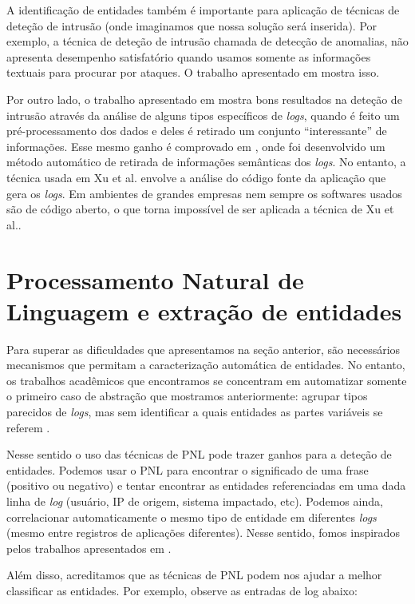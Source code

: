 \documentclass[
	12pt,				%
	openright,			%
	twoside,			%
	a4paper,			%
	english,			%
	spanish,			%
	brazil,				%
	]{abntex2}
\begin{document}
A identificação de entidades também é importante para aplicação de técnicas de deteção de intrusão (onde imaginamos que nossa solução será inserida). Por exemplo, a técnica de deteção de intrusão chamada de detecção de anomalias, não apresenta desempenho satisfatório quando usamos somente as informações textuais para procurar por ataques. O trabalho apresentado em \cite{li2013automatic} mostra isso.

Por outro lado, o trabalho apresentado em \cite{yen2013beehive} mostra bons resultados na deteção de intrusão através da análise de alguns tipos específicos de \emph{logs}, quando é feito um pré-processamento dos dados e deles é retirado um conjunto ``interessante'' de informações. Esse mesmo ganho é comprovado em \cite{xu2009detecting}, onde foi desenvolvido um método automático de retirada de informações semânticas dos \emph{logs}. No entanto, a técnica usada em Xu et al. envolve a análise do código fonte da aplicação que gera os \emph{logs}. Em ambientes de grandes empresas nem sempre os softwares usados são de código aberto, o que torna impossível de ser aplicada a técnica de Xu et al..

\section{Processamento Natural de Linguagem e extração de entidades}
Para superar as dificuldades que apresentamos na seção anterior, são necessários mecanismos que permitam a caracterização automática de entidades. No entanto, os trabalhos acadêmicos que encontramos se concentram em automatizar somente o primeiro caso de abstração que mostramos anteriormente: agrupar tipos parecidos de \emph{logs}, mas sem identificar a quais entidades as partes variáveis se referem \cite{vaarandi2003data, nagappan2010abstracting}.

Nesse sentido o uso das técnicas de PNL pode trazer ganhos para a deteção de entidades. Podemos usar o PNL para encontrar o significado de uma frase (positivo ou negativo) e tentar encontrar as entidades referenciadas em uma dada linha de \emph{log} (usuário, IP de origem, sistema impactado, etc). Podemos ainda, correlacionar automaticamente o mesmo tipo de entidade em diferentes \emph{logs} (mesmo entre registros de aplicações diferentes).  Nesse sentido, fomos inspirados pelos trabalhos apresentados em \cite{matos2010environment, duque2012processo}.

Além disso, acreditamos que as técnicas de PNL podem nos ajudar a melhor classificar as entidades. Por exemplo, observe as entradas de log abaixo:
\end{document}
